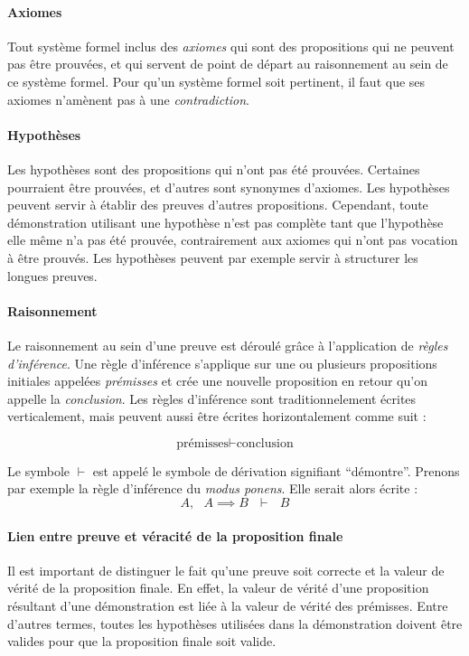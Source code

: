 			\paragraph{Axiomes} Tout système formel inclus des \emph{axiomes} qui sont des propositions qui ne peuvent pas être prouvées, et qui servent de point de départ au raisonnement au sein de ce système formel. Pour qu'un système formel soit pertinent, il faut que ses axiomes n'amènent pas à une \emph{contradiction}.

			\paragraph{Hypothèses} Les hypothèses sont des propositions qui n'ont pas été prouvées. Certaines pourraient être prouvées, et d'autres sont synonymes d'axiomes. Les hypothèses peuvent servir à établir des preuves d'autres propositions. Cependant, toute démonstration utilisant une hypothèse n'est pas complète tant que l'hypothèse elle même n'a pas été prouvée, contrairement aux axiomes qui n'ont pas vocation à être prouvés. Les hypothèses peuvent par exemple servir à structurer les longues preuves.

			\paragraph{Raisonnement}
			Le raisonnement au sein d'une preuve est déroulé grâce à l'application de \emph{règles d'inférence}. Une règle d'inférence s'applique sur une ou plusieurs propositions initiales appelées \emph{prémisses} et crée une nouvelle proposition en retour qu'on appelle la \emph{conclusion}.
			Les règles d'inférence sont traditionnelement écrites verticalement, mais peuvent aussi être écrites horizontalement comme suit :

			$$ \text{prémisses} \vdash \text{conclusion}$$

			Le symbole $\vdash$ est appelé le symbole de dérivation signifiant ``démontre''. Prenons par exemple la règle d'inférence du \emph{modus ponens}. Elle serait alors écrite :
			$$ A,~~~A \implies B~~~\vdash~~~B $$

			\paragraph{Lien entre preuve et véracité de la proposition finale} Il est important de distinguer le fait qu'une preuve soit correcte et la valeur de vérité de la proposition finale. En effet, la valeur de vérité d'une proposition résultant d'une démonstration est liée à la valeur de vérité des prémisses. Entre d'autres termes, toutes les hypothèses utilisées dans la démonstration doivent être valides pour que la proposition finale soit valide.


